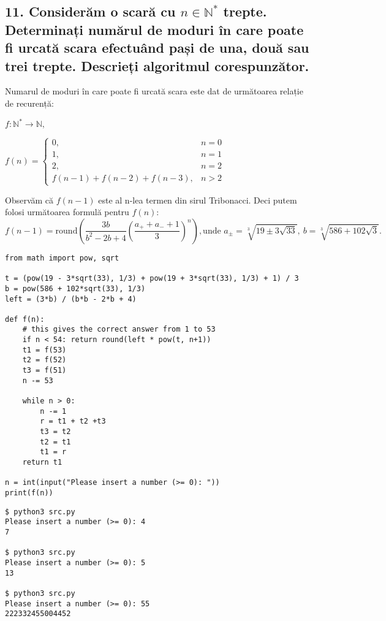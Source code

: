 \documentclass[11pt]{article}
\begin{document}
\begin{itemize}
\subsection*{11. Considerăm o scară cu \(n \in \mathbb{N}^*\) trepte. Determinați numărul de moduri în care poate fi urcată scara efectuând pași de una, două sau trei trepte. Descrieți algoritmul corespunzător.}
\label{sec:orgc004d93}


\hspace{\parindent}Numarul de moduri în care poate fi urcată scara este dat de următoarea relație de recurență:

$f : \mathbb{N}^* \to \mathbb{N},$

$
f(n) = 
\begin{cases}
0, & n = 0\\
1, & n = 1\\
2, & n = 2\\
f(n-1)+f(n-2)+f(n-3), & n > 2
\end{cases}
$

Observăm că $f(n-1)$ este al n-lea termen din sirul Tribonacci. Deci putem folosi următoarea formulă pentru $f(n)$:
\[
f(n - 1) = \mathrm{round} \left( 
   \frac{3b} {b^2-2b+4}
   \left(
   \frac{a_++a_-+1}{3}
   \right)^n
  \right),
\text{unde } a_{\pm} = \sqrt[3]{19 \pm 3 \sqrt{33}},\ b = \sqrt[3]{586+102\sqrt{3}}.
\]

\begin{verbatim}
from math import pow, sqrt

t = (pow(19 - 3*sqrt(33), 1/3) + pow(19 + 3*sqrt(33), 1/3) + 1) / 3
b = pow(586 + 102*sqrt(33), 1/3)
left = (3*b) / (b*b - 2*b + 4)

def f(n):
    # this gives the correct answer from 1 to 53
    if n < 54: return round(left * pow(t, n+1))
    t1 = f(53)
    t2 = f(52)
    t3 = f(51)
    n -= 53

    while n > 0:
        n -= 1
        r = t1 + t2 +t3
        t3 = t2
        t2 = t1
        t1 = r
    return t1

n = int(input("Please insert a number (>= 0): "))
print(f(n))
\end{verbatim}

\begin{verbatim}
$ python3 src.py
Please insert a number (>= 0): 4
7

$ python3 src.py
Please insert a number (>= 0): 5
13

$ python3 src.py
Please insert a number (>= 0): 55
222332455004452
\end{verbatim}


\end{itemize}
\end{document}

